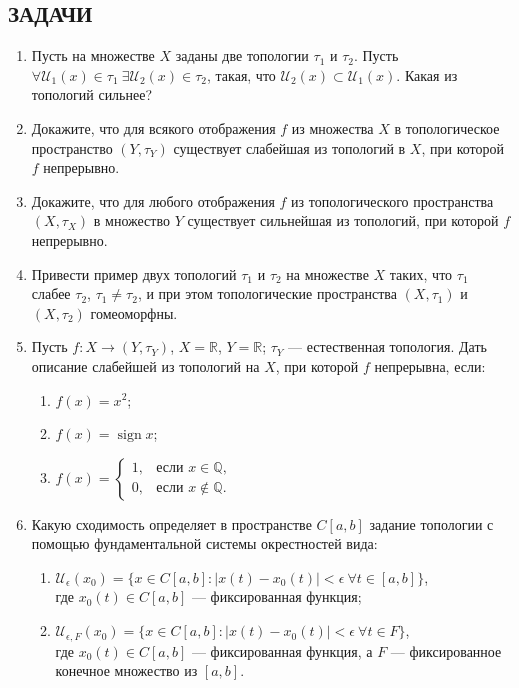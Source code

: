 \documentclass[12pt,a4paper]{article}
\begin{document}
\subsection*{ЗАДАЧИ}
\begin{enumerate}
\item Пусть на множестве $X$ заданы две топологии $\tau_{1}$ и $\tau_{2}$. Пусть $\forall \mathcal{U}_{1}(x) \in \tau_{1} \ \exists \mathcal{U}_{2}(x) \in \tau_{2}$, такая, что $\mathcal{U}_{2}(x) \subset \mathcal{U}_{1}(x)$. Какая из топологий сильнее?

\item Докажите, что для всякого отображения $f$ из множества $X$ в топологическое пространство $(Y, \tau_{Y})$ существует слабейшая из топологий в $X$, при которой $f$ непрерывно.

\item Докажите, что для любого отображения $f$ из топологического пространства $(X, \tau_{X})$ в множество $Y$ существует сильнейшая из топологий, при которой $f$ непрерывно.

\item Привести пример двух топологий $\tau_{1}$ и $\tau_{2}$ на множестве $X$ таких, что $\tau_{1}$ слабее $\tau_{2}$, $\tau_{1} \ne \tau_{2}$, и при этом топологические пространства $(X, \tau_{1})$ и $(X, \tau_{2})$ гомеоморфны.

\item Пусть $f: X \longrightarrow (Y, \tau_{Y})$, $X=\mathbb{R}$, $Y=\mathbb{R}$; $\tau_{Y}$ — естественная топология. Дать описание слабейшей из топологий на $X$, при которой $f$ непрерывна, если:
\begin{enumerate}[label=\alph*)]
\item $f(x) = x^{2}$;
\item $f(x) = \operatorname{sign} x$;
\item $f(x) =
\begin{cases} 1, & \text{если } x\in\mathbb{Q}, \\ 0, & \text{если } x\notin\mathbb{Q}.
\end{cases}$
\end{enumerate}

\item Какую сходимость определяет в пространстве $C[a, b]$ задание топологии с помощью фундаментальной системы окрестностей вида:
\begin{enumerate}[label=\alph*)]
\item $\mathcal{U}_{\epsilon}(x_{0}) = \{x \in C[a, b] : |x(t) - x_{0}(t)| < \epsilon \ \forall t \in [a, b]\}$, \\ где $x_{0}(t) \in C[a, b]$ — фиксированная функция;
\item $\mathcal{U}_{\epsilon, F}(x_{0}) = \{x \in C[a, b] : |x(t) - x_{0}(t)| < \epsilon \ \forall t \in F\}$, \\ где $x_{0}(t) \in C[a, b]$ — фиксированная функция, а $F$ — фиксированное конечное множество из $[a, b]$.
\end{enumerate}


\end{enumerate}
\end{document}
